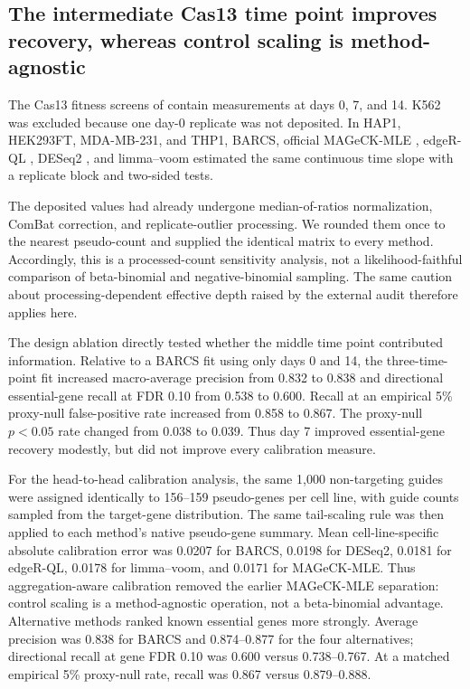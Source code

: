 \subsection{The intermediate Cas13 time point improves recovery, whereas
control scaling is method-agnostic}
\label{sec:liang}

The Cas13 fitness screens of \citet{liang2026lncrna} contain measurements at
days 0, 7, and 14.  K562 was excluded because one day-0 replicate was not
deposited.  In HAP1, HEK293FT, MDA-MB-231, and THP1, BARCS, official
MAGeCK-MLE \citep{li2014mageck}, edgeR-QL \citep{lun2016edger}, DESeq2
\citep{love2014deseq2}, and limma--voom \citep{law2014voom} estimated the same
continuous time slope with a replicate block and two-sided tests.

The deposited values had already undergone median-of-ratios normalization,
ComBat correction, and replicate-outlier processing.  We rounded them once to
the nearest pseudo-count and supplied the identical matrix to every method.
Accordingly, this is a processed-count sensitivity analysis, not a
likelihood-faithful comparison of beta-binomial and negative-binomial
sampling.  The same caution about processing-dependent effective depth raised
by the external audit therefore applies here.

The design ablation directly tested whether the middle time point contributed
information.  Relative to a BARCS fit using only days 0 and 14, the
three-time-point fit increased macro-average precision from 0.832 to 0.838 and
directional essential-gene recall at FDR 0.10 from 0.538 to 0.600.  Recall at
an empirical 5\% proxy-null false-positive rate increased from 0.858 to 0.867.
The proxy-null $p<0.05$ rate changed from 0.038 to 0.039.  Thus day 7
improved essential-gene recovery modestly, but did not improve every
calibration measure.

For the head-to-head calibration analysis, the same 1,000 non-targeting
guides were assigned identically to 156--159 pseudo-genes per cell line, with
guide counts sampled from the target-gene distribution.  The same tail-scaling
rule was then applied to each method's native pseudo-gene summary.  Mean
cell-line-specific absolute calibration error was 0.0207 for BARCS, 0.0198 for
DESeq2, 0.0181 for edgeR-QL, 0.0178 for limma--voom, and 0.0171 for
MAGeCK-MLE.  Thus aggregation-aware calibration removed the earlier
MAGeCK-MLE separation: control scaling is a method-agnostic operation, not a
beta-binomial advantage.  Alternative methods ranked known essential genes
more strongly.  Average precision was 0.838 for BARCS and 0.874--0.877 for
the four alternatives; directional recall at gene FDR 0.10 was 0.600 versus
0.738--0.767.  At a matched empirical 5\% proxy-null rate, recall was 0.867
versus 0.879--0.888.

